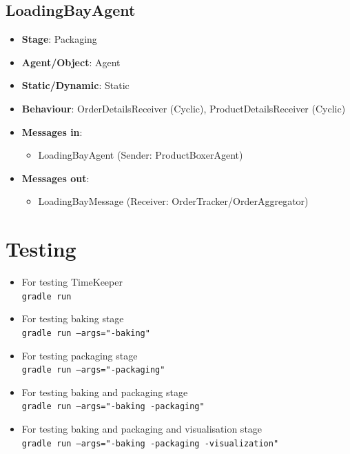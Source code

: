 \documentclass[12pt]{article}
\begin{document}
\newpage{}

\subsection{LoadingBayAgent}
\begin{itemize}
    \item \textbf{Stage}: Packaging
    \item \textbf{Agent/Object}: Agent
    \item \textbf{Static/Dynamic}: Static
    \item \textbf{Behaviour}: OrderDetailsReceiver (Cyclic), ProductDetailsReceiver (Cyclic)
    \item \textbf{Messages in}:
        \begin{itemize}
            \item LoadingBayAgent (Sender: ProductBoxerAgent)
        \end{itemize}
    \item \textbf{Messages out}:
        \begin{itemize}
            \item LoadingBayMessage (Receiver: OrderTracker/OrderAggregator)
        \end{itemize}
\end{itemize}

\section{Testing}%
\label{sec:testing}
\begin{itemize}
    \item For testing TimeKeeper \\\texttt{gradle run}
    \item For testing baking stage \\\texttt{gradle run --args="-baking"}
    \item For testing packaging stage \\\texttt{gradle run --args="-packaging"}
    \item For testing baking and packaging stage \\\texttt{gradle run --args="-baking -packaging"}
    \item For testing baking and packaging and visualisation stage \\\texttt{gradle run --args="-baking -packaging -visualization"}
\end{itemize}








\end{document}
